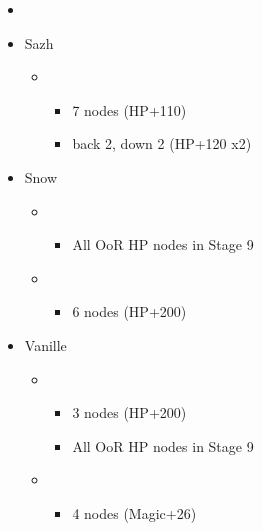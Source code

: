 \begin{menu}
	\begin{itemize}
	\paradigm
		\begin{itemize}
			\item {}%
				{\paradigmline{(\rav)}{\sen}{(\rav)}}%
				{\paradigmline{\com}{\com}{\sab}}%
				{\paradigmline{\syn}{\sen}{(\med)}}%
				{\paradigmline{\rav}{(\sen)}{(\med)}}%
				{\paradigmline[4]{\sab}{\sen}{\sab}}%
				{\paradigmline{\rav}{\sen}{\rav}}%
		\end{itemize}
	\crystarium
		\begin{itemize}
			\item Sazh
				\begin{itemize}
					\item \com
						\begin{itemize}
							\item 7 nodes (HP+110)
							\item back 2, down 2 (HP+120 x2)
						\end{itemize}
				\end{itemize}
			\item Snow
				\begin{itemize}
					\item \rav
						\begin{itemize}
							\item All OoR HP nodes in Stage 9
						\end{itemize}
					\item \com
						\begin{itemize}
							\item 6 nodes (HP+200)
						\end{itemize}
				\end{itemize}
			\item Vanille
				\begin{itemize}
					\item \sab
						\begin{itemize}
							\item 3 nodes (HP+200)
							\item All OoR HP nodes in Stage 9
						\end{itemize}
					\item \rav
						\begin{itemize}
							\item 4 nodes (Magic+26)
						\end{itemize}
				\end{itemize}								

\end{itemize}
\end{itemize}
\end{menu}
